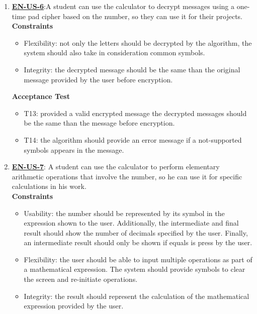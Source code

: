 \documentclass{report}
\begin{document}
\begin{enumerate}
\item \underline{\textbf{EN-US-6}}:A student can use the calculator to decrypt messages using a one-time pad cipher based on the number, so they can use it for their projects. \\ \newline
\textbf{Constraints}
\begin{itemize}
    \item Flexibility: not only the letters should be decrypted by the algorithm, the system should also take in consideration common symbols. 
    \item Integrity: the decrypted message should be the same than the original message provided by the user before encryption.
\end{itemize}

\textbf{Acceptance Test}
\begin{itemize}
    \item T13: provided a valid encrypted message the decrypted messages should be the same than the message before encryption.
    \item T14: the algorithm should provide an error message if a not-supported symbols appears in the message.\newline
    
\end{itemize}

\item \underline{\textbf{EN-US-7}}: A student can use the calculator to perform elementary arithmetic operations that involve the number, so he can use it for specific calculations in his work. \\ \newline
\textbf{Constraints}
\begin{itemize}
    \item Usability: the number should be represented by its symbol in the expression shown to the user. Additionally, the intermediate and final result should show the number of decimals specified by the user. Finally, an intermediate result should only be shown if equals is press by the user. 
    \item Flexibility: the user should be able to input multiple operations as part of a mathematical expression. The system should provide symbols to clear the screen and re-initiate operations. 
    \item Integrity: the result should represent the calculation of the mathematical expression provided by the user.
\end{itemize}


\end{enumerate}
\end{document}
